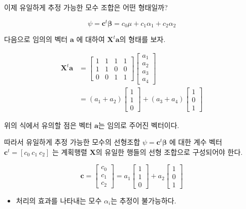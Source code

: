 \documentclass[
]{book}
\providecommand{\tightlist}{%
  \setlength{\itemsep}{0pt}\setlength{\parskip}{0pt}}
\newcommand{\bm}[1]{\boldsymbol{\mathbf{#1}}}
\begin{document}
이제 유일하게 추정 가능한 모수 조합은 어떤 형태일까?

\[ \psi = \bm c^t \bm \beta = c_0 \mu + c_1 \alpha_1 + c_2 \alpha_2 \]

다음으로 임의의 벡터 \(\bm a\) 에 대하여 \(\bm X^t \bm a\)의 형태를 보자.

\begin{align*}
\bm X^t \bm a & = 
\begin{bmatrix}
1 & 1 & 1 & 1  \\
1 & 1 & 0 & 0  \\
0 & 0 & 1 & 1  
\end{bmatrix}
\begin{bmatrix}
a_1 \\
a_2 \\
a_3 \\
a_4 
\end{bmatrix} \\
& = 
(a_1 + a_2)
\begin{bmatrix}
1 \\
1 \\
0 
\end{bmatrix}
+ 
(a_3 + a_4)
\begin{bmatrix}
1 \\
0 \\
1 
\end{bmatrix}
\end{align*}

위의 식에서 유의할 점은 벡터 \(\bm a\)는 임의로 주어진 벡터이다.

따라서 유일하게 추정 가능한 모수의 선형조합 \(\psi = \bm c^t \bm \beta\) 에 대한 계수 벡터 \(\bm c^t =[ c_0 ~ c_1 ~ c_2]\) 는 계획행렬 \(\bm X\)의 유일한 행들의 선형 조합으로 구성되어야 한다.

\begin{equation}
\bm c =
\begin{bmatrix}
c_0 \\
c_1 \\
c_2 
\end{bmatrix}
= 
a_1
\begin{bmatrix}
1 \\
1 \\
0 
\end{bmatrix}
+ 
a_2
\begin{bmatrix}
1 \\
0 \\
1 
\end{bmatrix}
\end{equation}

\begin{itemize}
\tightlist
\item
  처리의 효과를 나타내는 모수 \(\alpha_i\)는 추정이 불가능하다.
\end{itemize}
\end{document}
